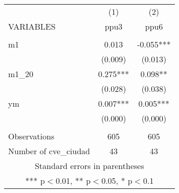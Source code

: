 \begin{tabular}{lcc} \hline
 & (1) & (2) \\
VARIABLES & ppu3 & ppu6 \\ \hline
 &  &  \\
m1 & 0.013 & -0.055*** \\
 & (0.009) & (0.013) \\
m1\_20 & 0.275*** & 0.098** \\
 & (0.028) & (0.038) \\
ym & 0.007*** & 0.005*** \\
 & (0.000) & (0.000) \\
 &  &  \\
Observations & 605 & 605 \\
 Number of cve\_ciudad & 43 & 43 \\ \hline
\multicolumn{3}{c}{ Standard errors in parentheses} \\
\multicolumn{3}{c}{ *** p$<$0.01, ** p$<$0.05, * p$<$0.1} \\
\end{tabular}
